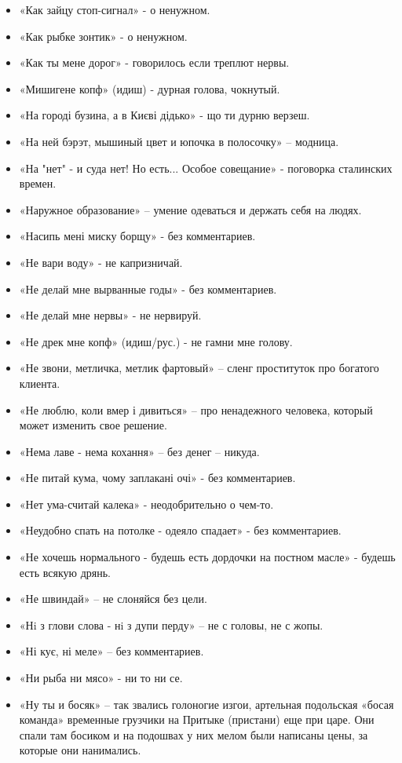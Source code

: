 \begin{itemize}
\item  «Как зайцу стоп-сигнал» - о ненужном.
\item  «Как рыбке зонтик» - о ненужном.
\item  «Как ты мене дорог» - говорилось если треплют  нервы.
\item  «Мишигене копф» (идиш) - дурная голова, чокнутый.
\item  «На городі бузина, а в Києві дідько» - що ти дурню верзеш.
\item  «На ней бэрэт, мышиный цвет и юпочка в полосочку» – модница.
\item  «На "нет" - и суда нет! Но есть... Особое совещание» - поговорка сталинских времен.
\item  «Наружное образование» – умение одеваться и держать себя на людях.
\item  «Насипь мені миску борщу» - без комментариев.
\item  «Не вари воду» - не капризничай.
\item  «Не делай мне вырванные годы» - без комментариев. 
\item  «Не делай мне нервы» - не нервируй.
\item  «Не дрек мне копф» (идиш/рус.) - не гамни мне голову. 
\item  «Не звони, метличка, метлик фартовый» – сленг проституток про богатого клиента.
\item  «Не люблю, коли вмер і дивиться» – про ненадежного человека, который может изменить свое решение.
\item  «Нема лаве - нема кохання» – без денег – никуда.
\item  «Не питай кума, чому заплакані очі» - без комментариев.
\item  «Нет ума-считай калека» - неодобрительно о чем-то.
\item  «Неудобно спать на потолке - одеяло спадает» - без комментариев.
\item  «Не хочешь нормального - будешь есть дордочки на постном масле» - будешь есть всякую дрянь.
\item  «Не швиндай» – не слоняйся без цели.
\item  «Нi з глови слова - нi з дупи перду» – не с головы, не с жопы.
\item  «Ні кує, ні меле» – без комментариев.
\item  «Ни рыба ни мясо» - ни то ни се.
\item  «Ну ты и босяк» – так звались голоногие изгои, артельная подольская «босая команда» временные грузчики на Притыке (пристани) еще при царе. Они спали там босиком и на подошвах у них мелом были написаны цены, за которые они нанимались.

\end{itemize}
